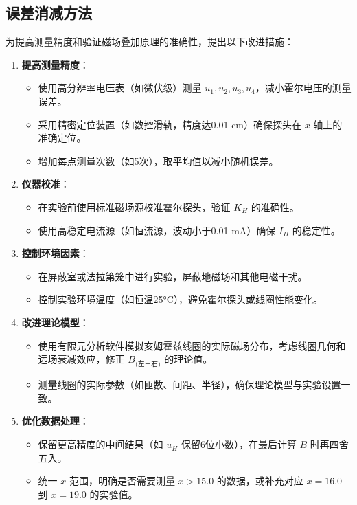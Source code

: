 \documentclass[12pt]{article}
\begin{document}
\begin{CJK}{UTF8}{gbsn}
\subsection{误差消减方法}
为提高测量精度和验证磁场叠加原理的准确性，提出以下改进措施：
\begin{enumerate}
    \item \textbf{提高测量精度}：
        \begin{itemize}
            \item 使用高分辨率电压表（如微伏级）测量 \( u_1, u_2, u_3, u_4 \)，减小霍尔电压的测量误差。
            \item 采用精密定位装置（如数控滑轨，精度达0.01 cm）确保探头在 \( x \) 轴上的准确定位。
            \item 增加每点测量次数（如5次），取平均值以减小随机误差。
        \end{itemize}
    \item \textbf{仪器校准}：
        \begin{itemize}
            \item 在实验前使用标准磁场源校准霍尔探头，验证 \( K_H \) 的准确性。
            \item 使用高稳定电流源（如恒流源，波动小于0.01 mA）确保 \( I_H \) 的稳定性。
        \end{itemize}
    \item \textbf{控制环境因素}：
        \begin{itemize}
            \item 在屏蔽室或法拉第笼中进行实验，屏蔽地磁场和其他电磁干扰。
            \item 控制实验环境温度（如恒温25°C），避免霍尔探头或线圈性能变化。
        \end{itemize}
    \item \textbf{改进理论模型}：
        \begin{itemize}
            \item 使用有限元分析软件模拟亥姆霍兹线圈的实际磁场分布，考虑线圈几何和远场衰减效应，修正 \( B_{\text{(左＋右)}} \) 的理论值。
            \item 测量线圈的实际参数（如匝数、间距、半径），确保理论模型与实验设置一致。
        \end{itemize}
    \item \textbf{优化数据处理}：
        \begin{itemize}
            \item 保留更高精度的中间结果（如 \( u_H \) 保留6位小数），在最后计算 \( B \) 时再四舍五入。
            \item 统一 \( x \) 范围，明确是否需要测量 \( x > 15.0 \) 的数据，或补充对应 \( x = 16.0 \) 到 \( x = 19.0 \) 的实验值。
        \end{itemize}
\end{enumerate}


\end{CJK}
\end{document}
